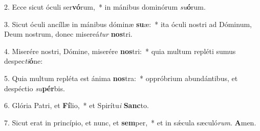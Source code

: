 2. Ecce sicut óculi ser\textbf{vó}rum,~*  in mánibus dominórum \textit{su}\textbf{ó}rum.\

3. Sicut óculi ancíllæ in mánibus dóminæ \textbf{su}æ:~*  ita óculi nostri ad Dóminum, Deum nostrum, donec misereá\textit{tur} \textbf{nos}tri.\

4. Miserére nostri, Dómine, miserére \textbf{nos}tri:~*  quia multum repléti sumus despec\textit{ti}\textbf{ó}ne:\

5. Quia multum repléta est ánima \textbf{nos}tra:~*  oppróbrium abundántibus, et despéctio \textit{su}\textbf{pér}bis.\

6. Glória Patri, et \textbf{Fí}lio,~*  et Spirítu\textit{i} \textbf{Sanc}to.\

7. Sicut erat in princípio, et nunc, et \textbf{sem}per,~*  et in sǽcula sæculó\textit{rum}. \textbf{A}men.\

